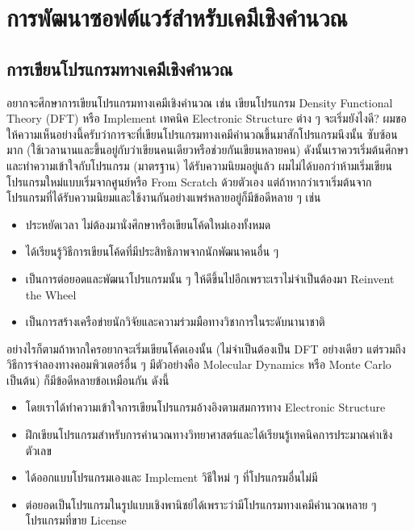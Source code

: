 

\chapter{การพัฒนาซอฟต์แวร์สำหรับเคมีเชิงคำนวณ}
\label{ch:software_dev}

\section{การเขียนโปรแกรมทางเคมีเชิงคำนวณ}

อยากจะศึกษาการเขียนโปรแกรมทางเคมีเชิงคำนวณ เช่น เขียนโปรแกรม Density Functional Theory (DFT) หรือ Implement เทคนิค 
Electronic Structure ต่าง ๆ จะเริ่มยังไงดี? ผมขอให้ความเห็นอย่างนี้ครับว่าการจะที่เขียนโปรแกรมทางเคมีคำนวณขึ้นมาสักโปรแกรมนึงนั้น%
ซับซ้อนมาก (ใช้เวลานานและขึ้นอยู่กับว่าเขียนคนเดียวหรือช่วยกันเขียนหลายคน) ดังนั้นเราควรเริ่มต้นศึกษาและทำความเข้าใจกับโปรแกรม (มาตรฐาน) 
ได้รับความนิยมอยู่แล้ว ผมไม่ได้บอกว่าห้ามเริ่มเขียนโปรแกรมใหม่แบบเริ่มจากศูนย์หรือ From Scratch ด้วยตัวเอง แต่ถ้าหากว่าเราเริ่มต้นจาก%
โปรแกรมที่ได้รับความนิยมและใช้งานกันอย่างแพร่หลายอยู่ก็มีข้อดีหลาย ๆ เช่น 

\begin{itemize}
    \item ประหยัดเวลา ไม่ต้องมานั่งศึกษาหรือเขียนโค้ดใหม่เองทั้งหมด
    \item ได้เรียนรู้วิธีการเขียนโค้ดที่มีประสิทธิภาพจากนักพัฒนาคนอื่น ๆ 
    \item เป็นการต่อยอดและพัฒนาโปรแกรมนั้น ๆ ให้ดีขึ้นไปอีกเพราะเราไม่จำเป็นต้องมา Reinvent the Wheel 
    \item เป็นการสร้างเครือข่ายนักวิจัยและความร่วมมือทางวิชาการในระดับนานาชาติ 
\end{itemize}

\noindent อย่างไรก็ตามถ้าหากใครอยากจะเริ่มเขียนโค้ดเองนั้น (ไม่จำเป็นต้องเป็น DFT อย่างเดียว แต่รวมถึงวิธีการจำลองทางคอมพิวเตอร์อื่น ๆ 
มีตัวอย่างคือ Molecular Dynamics หรือ Monte Carlo เป็นต้น) ก็มีข้อดีหลายข้อเหมือนกัน ดังนี้ 

\begin{itemize}
    \item โดยเราได้ทำความเข้าใจการเขียนโปรแกรมอ้างอิงตามสมการทาง Electronic Structure 
    \item ฝึกเขียนโปรแกรมสำหรับการคำนวณทางวิทยาศาสตร์และได้เรียนรู้เทคนิคการประมาณค่าเชิงตัวเลข
    \item ได้ออกแบบโปรแกรมเองและ Implement วิธีใหม่ ๆ ที่โปรแกรมอื่นไม่มี
    \item ต่อยอดเป็นโปรแกรมในรูปแบบเชิงพานิชย์ได้เพราะว่ามีโปรแกรมทางเคมีคำนวณหลาย ๆ โปรแกรมที่ขาย License
\end{itemize}

